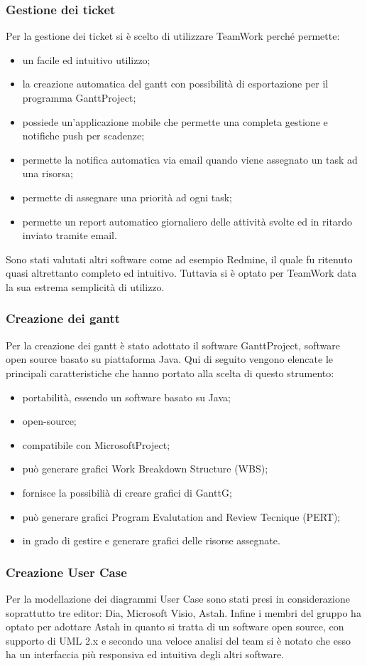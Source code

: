 		\subsubsection{Gestione dei ticket}
			Per la gestione dei ticket si è scelto di utilizzare TeamWork perché permette:
			\begin{itemize}
				\item un facile ed intuitivo utilizzo;
				\item la creazione automatica del gantt con possibilità di esportazione per il programma GanttProject;
				\item possiede un'applicazione mobile che permette una completa gestione e notifiche push per scadenze;
				\item permette la notifica automatica via email quando viene assegnato un task ad una risorsa;
				\item permette di assegnare una priorità ad ogni task;
				\item permette un report automatico giornaliero delle attività svolte ed in ritardo inviato tramite email.
			\end{itemize}
			Sono stati valutati altri software come ad esempio Redmine, il quale fu ritenuto quasi altrettanto completo ed intuitivo. Tuttavia si è optato per TeamWork data la sua estrema semplicità di utilizzo.
		\subsubsection{Creazione dei gantt}
			Per la creazione dei gantt è stato adottato il software GanttProject, software open source basato su piattaforma Java. Qui di seguito vengono elencate le principali caratteristiche che hanno portato alla scelta di questo strumento:
			\begin{itemize}
				\item portabilità, essendo un software basato su Java;
				\item open-source;
				\item compatibile con MicrosoftProject;
				\item può generare grafici Work Breakdown Structure (WBS);
				\item fornisce la possibilià di creare grafici di GanttG;
				\item può generare grafici Program Evalutation and Review Tecnique (PERT);
				\item in grado di gestire e generare grafici delle risorse assegnate.
			\end{itemize}
		\subsubsection{Creazione User Case}
			Per la modellazione dei diagrammi User Case sono stati presi in considerazione soprattutto tre editor: Dia, Microsoft Visio, Astah. Infine i membri del gruppo \groupname{} ha optato per adottare Astah in quanto si tratta di un software open source, con supporto di UML 2.x e secondo una veloce analisi del team si è notato che esso ha un interfaccia più responsiva ed intuitiva degli altri software.
